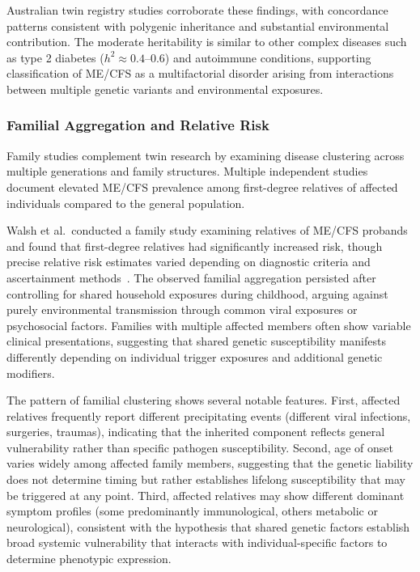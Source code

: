 Australian twin registry studies corroborate these findings, with concordance patterns consistent with polygenic inheritance and substantial environmental contribution. The moderate heritability is similar to other complex diseases such as type 2 diabetes ($h^2 \approx 0.4$--$0.6$) and autoimmune conditions, supporting classification of ME/CFS as a multifactorial disorder arising from interactions between multiple genetic variants and environmental exposures.

\subsubsection{Familial Aggregation and Relative Risk}

Family studies complement twin research by examining disease clustering across multiple generations and family structures. Multiple independent studies document elevated ME/CFS prevalence among first-degree relatives of affected individuals compared to the general population.

Walsh et al.\ conducted a family study examining relatives of ME/CFS probands and found that first-degree relatives had significantly increased risk, though precise relative risk estimates varied depending on diagnostic criteria and ascertainment methods~\cite{Walsh2001}. The observed familial aggregation persisted after controlling for shared household exposures during childhood, arguing against purely environmental transmission through common viral exposures or psychosocial factors. Families with multiple affected members often show variable clinical presentations, suggesting that shared genetic susceptibility manifests differently depending on individual trigger exposures and additional genetic modifiers.

The pattern of familial clustering shows several notable features. First, affected relatives frequently report different precipitating events (different viral infections, surgeries, traumas), indicating that the inherited component reflects general vulnerability rather than specific pathogen susceptibility. Second, age of onset varies widely among affected family members, suggesting that the genetic liability does not determine timing but rather establishes lifelong susceptibility that may be triggered at any point. Third, affected relatives may show different dominant symptom profiles (some predominantly immunological, others metabolic or neurological), consistent with the hypothesis that shared genetic factors establish broad systemic vulnerability that interacts with individual-specific factors to determine phenotypic expression.

